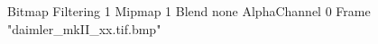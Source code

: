 {Bitmap
	{Filtering 1}
	{Mipmap 1}
	{Blend none}
	{AlphaChannel 0}
	{Frame "daimler_mkII_xx.tif.bmp"}
}
